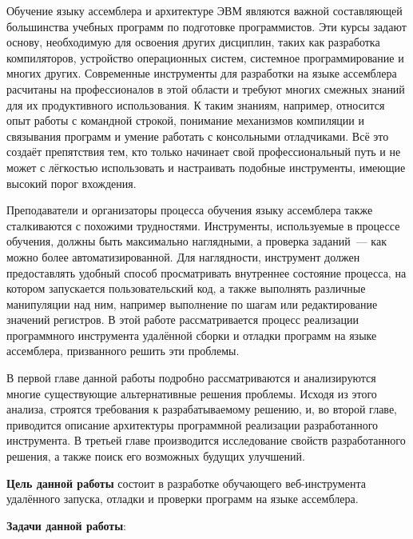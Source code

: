\documentclass[a4paper,article,14pt]{extarticle}
\begin{document}


\tableofcontents
\pagebreak


Обучение языку ассемблера и архитектуре ЭВМ являются важной составляющей большинства учебных программ по подготовке программистов. Эти курсы задают основу, необходимую для освоения других дисциплин, таких как разработка компиляторов, устройство операционных систем, системное программирование и многих других. Современные инструменты для разработки на языке ассемблера расчитаны на профессионалов в этой области и требуют многих смежных знаний для их продуктивного использования. К таким знаниям, например, относится опыт работы с командной строкой, понимание механизмов компиляции и связывания программ и умение работать с консольными отладчиками. Всё это создаёт препятствия тем, кто только начинает свой профессиональный путь и не может с лёгкостью использовать и настраивать подобные инструменты, имеющие высокий порог вхождения.

Преподаватели и организаторы процесса обучения языку ассемблера также сталкиваются с похожими трудностями. Инструменты, используемые в процессе обучения, должны быть максимально наглядными, а проверка заданий~--- как можно более автоматизированной. Для наглядности, инструмент должен предоставлять удобный способ просматривать внутреннее состояние процесса, на котором запускается пользовательский код, а также выполнять различные манипуляции над ним, например выполнение по шагам или редактирование значений регистров. В этой работе рассматривается процесс реализации программного инструмента удалённой сборки и отладки программ на языке ассемблера, призванного решить эти проблемы.

В первой главе данной работы подробно рассматриваются и анализируются многие существующие альтернативные решения проблемы. Исходя из этого анализа, строятся требования к разрабатываемому решению, и, во второй главе, приводится описание архитектуры программной реализации разработанного инструмента. В третьей главе производится исследование свойств разработанного решения, а также поиск его возможных будущих улучшений.

\pagebreak
{}

\textbf{Цель данной работы} состоит в разработке обучающего веб-инструмента удалённого запуска, отладки и проверки программ на языке ассемблера.

\textbf{Задачи данной работы}:
\end{document}
